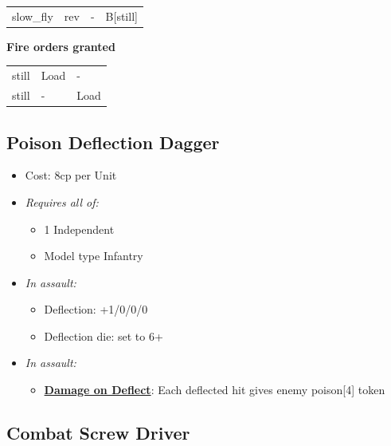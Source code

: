 \documentclass[a4paper,12pt]{article}
\begin{document}
\begin{tabular}{llll}
slow\_fly & rev & - & B[still] \\
\end{tabular}
\vspace{1ex}


\noindent\textbf{Fire orders granted}

\begin{tabular}{lll}
still & Load & - \\
still & - & Load \\
\end{tabular}
\vspace{1ex}

\subsection{Poison Deflection Dagger}
\label{equipment-poison-deflection-dagger}

\begin{itemize}
\item Cost: 8cp per Unit
\item \textit{Requires all of:}
\begin{itemize}
\item 1 Independent
\item Model type Infantry
\end{itemize}

\item \textit{In assault:}
\begin{itemize}
\item Deflection: +1/0/0/0
\item Deflection die: set to 6+
\end{itemize}

\item \textit{In assault:}
\begin{itemize}
\item \textbf{\hyperref[rule-special-damage-on-deflect]{Damage on Deflect}}: Each deflected hit gives enemy poison[4] token

\end{itemize}




\end{itemize}

\subsection{Combat Screw Driver}
\label{equipment-combat-screw-driver}
\end{document}
